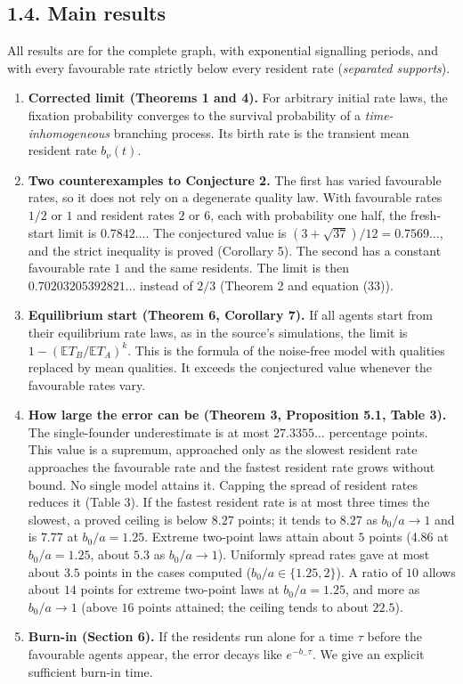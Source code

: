 \documentclass[
  british,
  11pt,
  a4paper,
]{article}
\providecommand{\tightlist}{%
  \setlength{\itemsep}{0pt}\setlength{\parskip}{0pt}}
\begin{document}
\subsection{1.4. Main results}\label{main-results}

All results are for the complete graph, with exponential signalling
periods, and with every favourable rate strictly below every resident
rate (\emph{separated supports}).

\begin{enumerate}
\def\labelenumi{\arabic{enumi}.}
\tightlist
\item
  \textbf{Corrected limit (Theorems 1 and 4).} For arbitrary initial
  rate laws, the fixation probability converges to the survival
  probability of a \emph{time-inhomogeneous} branching process. Its
  birth rate is the transient mean resident rate \(b_\nu(t)\).
\item
  \textbf{Two counterexamples to Conjecture 2.} The first has varied
  favourable rates, so it does not rely on a degenerate quality law.
  With favourable rates \(1/2\) or \(1\) and resident rates \(2\) or
  \(6\), each with probability one half, the fresh-start limit is
  \(0.7842\ldots\). The conjectured value is
  \((3+\sqrt{37})/12=0.7569\ldots\), and the strict inequality is proved
  (Corollary 5). The second has a constant favourable rate \(1\) and the
  same residents. The limit is then \(0.70203205392821\ldots\) instead
  of \(2/3\) (Theorem 2 and equation (33)).
\item
  \textbf{Equilibrium start (Theorem 6, Corollary 7).} If all agents
  start from their equilibrium rate laws, as in the source's
  simulations, the limit is \(1-(\mathbb E T_B/\mathbb E T_A)^k\). This
  is the formula of the noise-free model with qualities replaced by mean
  qualities. It exceeds the conjectured value whenever the favourable
  rates vary.
\item
  \textbf{How large the error can be (Theorem 3, Proposition 5.1, Table
  3).} The single-founder underestimate is at most \(27.3355\ldots\)
  percentage points. This value is a supremum, approached only as the
  slowest resident rate approaches the favourable rate and the fastest
  resident rate grows without bound. No single model attains it. Capping
  the spread of resident rates reduces it (Table 3). If the fastest
  resident rate is at most three times the slowest, a proved ceiling is
  below \(8.27\) points; it tends to \(8.27\) as \(b_0/a\to1\) and is
  \(7.77\) at \(b_0/a=1.25\). Extreme two-point laws attain about \(5\)
  points (4.86 at \(b_0/a=1.25\), about \(5.3\) as \(b_0/a\to1\)).
  Uniformly spread rates gave at most about \(3.5\) points in the cases
  computed (\(b_0/a\in\{1.25,2\}\)). A ratio of \(10\) allows about
  \(14\) points for extreme two-point laws at \(b_0/a=1.25\), and more
  as \(b_0/a\to1\) (above \(16\) points attained; the ceiling tends to
  about \(22.5\)).
\item
  \textbf{Burn-in (Section 6).} If the residents run alone for a time
  \(\tau\) before the favourable agents appear, the error decays like
  \(e^{-b_-\tau}\). We give an explicit sufficient burn-in time.
\end{enumerate}
\end{document}
